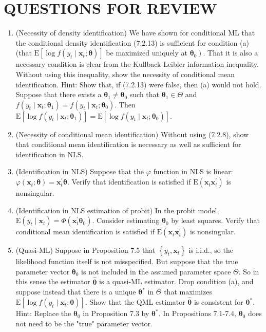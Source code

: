 \documentclass[10pt]{article}
\begin{document}
\section*{QUESTIONS FOR REVIEW}
\begin{enumerate}
  \item (Necessity of density identification) We have shown for conditional ML that the conditional density identification (7.2.13) is sufficient for condition (a) (that $\mathrm{E}\left[\log f\left(y_{t} \mid \mathbf{x}_{t} ; \boldsymbol{\theta}\right)\right]$ be maximized uniquely at $\left.\boldsymbol{\theta}_{0}\right)$. That it is also a necessary condition is clear from the Kullback-Leibler information inequality. Without using this inequality, show the necessity of conditional mean identification. Hint: Show that, if (7.2.13) were false, then (a) would not hold. Suppose that there exists a $\boldsymbol{\theta}_{1} \neq \boldsymbol{\theta}_{0}$ such that $\boldsymbol{\theta}_{1} \in \Theta$ and $f\left(y_{t} \mid \mathbf{x}_{t} ; \boldsymbol{\theta}_{1}\right)=f\left(y_{t} \mid \mathbf{x}_{t} ; \boldsymbol{\theta}_{0}\right)$. Then $\mathrm{E}\left[\log f\left(y_{t} \mid \mathbf{x}_{t} ; \boldsymbol{\theta}_{1}\right)\right]=\mathrm{E}\left[\log f\left(y_{t} \mid \mathbf{x}_{t} ; \boldsymbol{\theta}_{0}\right)\right]$.
  \item (Necessity of conditional mean identification) Without using (7.2.8), show that conditional mean identification is necessary as well as sufficient for identification in NLS.
  \item (Identification in NLS) Suppose that the $\varphi$ function in NLS is linear: $\varphi\left(\mathbf{x}_{t} ; \boldsymbol{\theta}\right)=\mathbf{x}_{t}^{\prime} \boldsymbol{\theta}$. Verify that identification is satisfied if $\mathrm{E}\left(\mathbf{x}_{t} \mathbf{x}_{t}^{\prime}\right)$ is nonsingular.
  \item (Identification in NLS estimation of probit) In the probit model, $\mathrm{E}\left(y_{t} \mid \mathbf{x}_{t}\right)= \Phi\left(\mathbf{x}_{t}^{\prime} \boldsymbol{\theta}_{0}\right)$. Consider estimating $\boldsymbol{\theta}_{0}$ by least squares. Verify that conditional mean identification is satisfied if $\mathrm{E}\left(\mathbf{x}_{t} \mathbf{x}_{t}^{\prime}\right)$ is nonsingular.
  \item (Quasi-ML) Suppose in Proposition 7.5 that $\left\{y_{t}, \mathbf{x}_{t}\right\}$ is i.i.d., so the likelihood function itself is not misspecified. But suppose that the true parameter vector $\boldsymbol{\theta}_{0}$ is not included in the assumed parameter space $\Theta$. So in this sense the estimator $\hat{\boldsymbol{\theta}}$ is a quasi-ML estimator. Drop condition (a), and suppose instead that there is a unique $\boldsymbol{\theta}^{*}$ in $\Theta$ that maximizes $\mathrm{E}\left[\log f\left(y_{t} \mid \mathbf{x}_{t} ; \boldsymbol{\theta}\right)\right]$. Show that the QML estimator $\hat{\boldsymbol{\theta}}$ is consistent for $\boldsymbol{\theta}^{*}$. Hint: Replace the $\boldsymbol{\theta}_{0}$ in Proposition 7.3 by $\boldsymbol{\theta}^{*}$. In Propositions 7.1-7.4, $\boldsymbol{\theta}_{0}$ does not need to be the "true" parameter vector.

\end{enumerate}
\end{document}
